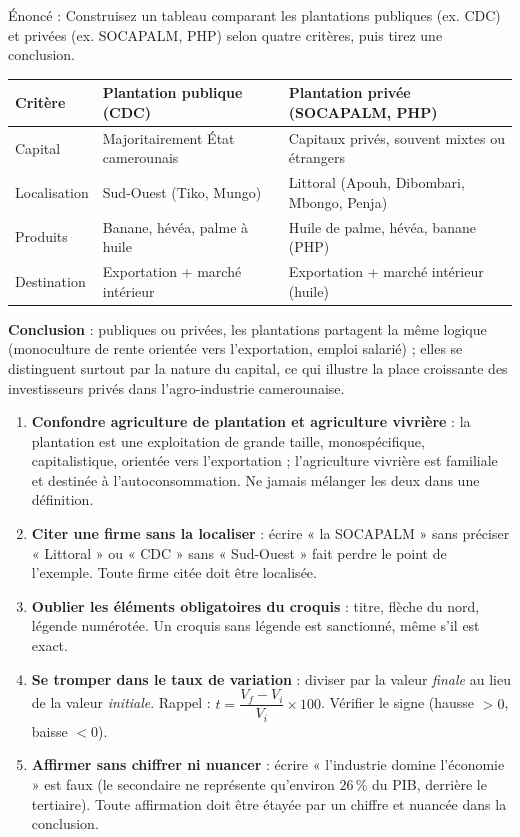\documentclass[11pt]{article}
\begin{document}
\begin{exoresolu}
Énoncé : Construisez un tableau comparant les plantations publiques (ex. CDC) et privées (ex. SOCAPALM, PHP) selon quatre critères, puis tirez une conclusion.
\tcblower
\begin{center}
\begin{tabularx}{\linewidth}{|l|X|X|}
\hline
\rowcolor{popblueL} \textbf{Critère} & \textbf{Plantation publique (CDC)} & \textbf{Plantation privée (SOCAPALM, PHP)} \\
\hline
Capital & Majoritairement État camerounais & Capitaux privés, souvent mixtes ou étrangers \\
\hline
Localisation & Sud-Ouest (Tiko, Mungo) & Littoral (Apouh, Dibombari, Mbongo, Penja) \\
\hline
Produits & Banane, hévéa, palme à huile & Huile de palme, hévéa, banane (PHP) \\
\hline
Destination & Exportation + marché intérieur & Exportation + marché intérieur (huile) \\
\hline
\end{tabularx}
\end{center}
\textbf{Conclusion} : publiques ou privées, les plantations partagent la même logique (monoculture de rente orientée vers l'exportation, emploi salarié) ; elles se distinguent surtout par la nature du capital, ce qui illustre la place croissante des investisseurs privés dans l'agro-industrie camerounaise.
\end{exoresolu}

\begin{attention}
\begin{enumerate}
\item \textbf{Confondre agriculture de plantation et agriculture vivrière} : la plantation est une exploitation de grande taille, monospécifique, capitalistique, orientée vers l'exportation ; l'agriculture vivrière est familiale et destinée à l'autoconsommation. Ne jamais mélanger les deux dans une définition.
\item \textbf{Citer une firme sans la localiser} : écrire « la SOCAPALM » sans préciser « Littoral » ou « CDC » sans « Sud-Ouest » fait perdre le point de l'exemple. Toute firme citée doit être localisée.
\item \textbf{Oublier les éléments obligatoires du croquis} : titre, flèche du nord, légende numérotée. Un croquis sans légende est sanctionné, même s'il est exact.
\item \textbf{Se tromper dans le taux de variation} : diviser par la valeur \emph{finale} au lieu de la valeur \emph{initiale}. Rappel : $t = \dfrac{V_f - V_i}{V_i}\times 100$. Vérifier le signe (hausse $>0$, baisse $<0$).
\item \textbf{Affirmer sans chiffrer ni nuancer} : écrire « l'industrie domine l'économie » est faux (le secondaire ne représente qu'environ $26\,\%$ du PIB, derrière le tertiaire). Toute affirmation doit être étayée par un chiffre et nuancée dans la conclusion.
\end{enumerate}
\end{attention}
\end{document}

